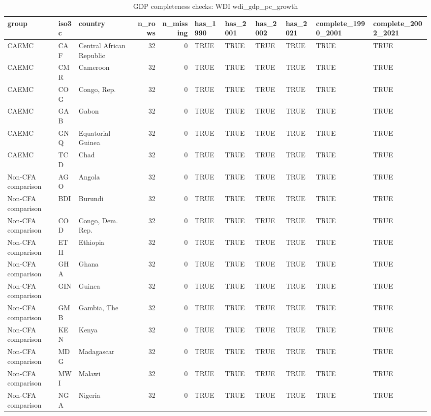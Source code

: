 \begin{table}

\caption{GDP completeness checks: WDI wdi_gdp_pc_growth}
\centering
\begin{tabular}[t]{lllrrllllll}
\toprule
group & iso3c & country & n\_rows & n\_missing & has\_1990 & has\_2001 & has\_2002 & has\_2021 & complete\_1990\_2001 & complete\_2002\_2021\\
\midrule
CAEMC & CAF & Central African Republic & 32 & 0 & TRUE & TRUE & TRUE & TRUE & TRUE & TRUE\\
CAEMC & CMR & Cameroon & 32 & 0 & TRUE & TRUE & TRUE & TRUE & TRUE & TRUE\\
CAEMC & COG & Congo, Rep. & 32 & 0 & TRUE & TRUE & TRUE & TRUE & TRUE & TRUE\\
CAEMC & GAB & Gabon & 32 & 0 & TRUE & TRUE & TRUE & TRUE & TRUE & TRUE\\
CAEMC & GNQ & Equatorial Guinea & 32 & 0 & TRUE & TRUE & TRUE & TRUE & TRUE & TRUE\\
\addlinespace
CAEMC & TCD & Chad & 32 & 0 & TRUE & TRUE & TRUE & TRUE & TRUE & TRUE\\
Non-CFA comparison & AGO & Angola & 32 & 0 & TRUE & TRUE & TRUE & TRUE & TRUE & TRUE\\
Non-CFA comparison & BDI & Burundi & 32 & 0 & TRUE & TRUE & TRUE & TRUE & TRUE & TRUE\\
Non-CFA comparison & COD & Congo, Dem. Rep. & 32 & 0 & TRUE & TRUE & TRUE & TRUE & TRUE & TRUE\\
Non-CFA comparison & ETH & Ethiopia & 32 & 0 & TRUE & TRUE & TRUE & TRUE & TRUE & TRUE\\
\addlinespace
Non-CFA comparison & GHA & Ghana & 32 & 0 & TRUE & TRUE & TRUE & TRUE & TRUE & TRUE\\
Non-CFA comparison & GIN & Guinea & 32 & 0 & TRUE & TRUE & TRUE & TRUE & TRUE & TRUE\\
Non-CFA comparison & GMB & Gambia, The & 32 & 0 & TRUE & TRUE & TRUE & TRUE & TRUE & TRUE\\
Non-CFA comparison & KEN & Kenya & 32 & 0 & TRUE & TRUE & TRUE & TRUE & TRUE & TRUE\\
Non-CFA comparison & MDG & Madagascar & 32 & 0 & TRUE & TRUE & TRUE & TRUE & TRUE & TRUE\\
\addlinespace
Non-CFA comparison & MWI & Malawi & 32 & 0 & TRUE & TRUE & TRUE & TRUE & TRUE & TRUE\\
Non-CFA comparison & NGA & Nigeria & 32 & 0 & TRUE & TRUE & TRUE & TRUE & TRUE & TRUE\\

\end{tabular}
\end{table}
